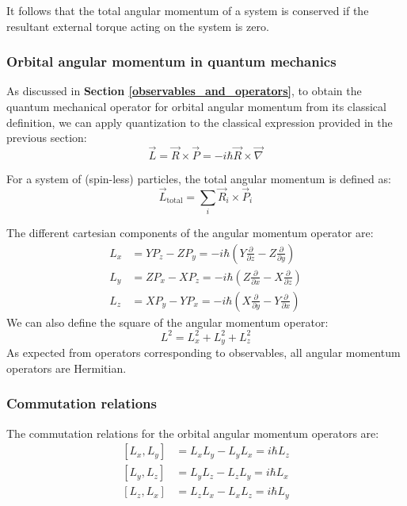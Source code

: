 It follows that the total angular momentum of a system is conserved if the resultant external torque acting on the system is zero.

\subsubsection{Orbital angular momentum in quantum mechanics}

As discussed in \textbf{Section \ref{observables_and_operators}}, to obtain the quantum mechanical operator for orbital angular momentum from its classical definition, we can apply quantization to the classical expression provided in the previous section:
\begin{equation}
    \vec{L} = \vec{R} \times \vec{P} = -i\hbar \vec{R}\times \vec{\nabla}
\end{equation}

For a system of (spin-less) particles, the total angular momentum is defined as:
\begin{equation}
    \vec{L}_\text{total} = \sum_i \vec{R}_i \times \vec{P}_i
\end{equation}

The different cartesian components of the angular momentum operator are:
\begin{equation}
    \begin{split}
        L_x &= YP_z - ZP_y = -i\hbar \left(Y\frac{\partial}{\partial z} - Z\frac{\partial}{\partial y}\right) \\
        L_y &= ZP_x - XP_z = -i\hbar \left(Z\frac{\partial}{\partial x} - X\frac{\partial}{\partial z}\right) \\
        L_z &= XP_y - YP_x = -i\hbar \left(X\frac{\partial}{\partial y} - Y\frac{\partial}{\partial x}\right)
    \end{split}
\end{equation}
We can also define the square of the angular momentum operator:
\begin{equation}
    L^2 = L_x^2 + L_y^2 + L_z^2
\end{equation}
As expected from operators corresponding to observables, all angular momentum operators are Hermitian.

\subsubsection{Commutation relations}

The commutation relations for the orbital angular momentum operators are:
\begin{equation}
    \begin{split}
        [L_x, L_y] &= L_xL_y - L_yL_x = i\hbar L_z \\
        [L_y, L_z] &= L_yL_z - L_zL_y = i\hbar L_x \\
        [L_z, L_x] &= L_zL_x - L_xL_z = i\hbar L_y
    \end{split}
\end{equation}

